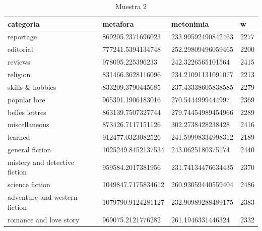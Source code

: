 \documentclass[12pt,letterpaper,twoside]{article}
\begin{document}
\begin{center}
    \begin{longtable}{| p{} | p{} | p{}|p{}|}
\caption{Muestra 2} 
    \hline
         categoria & metafora & metonimia & w \\ \hline
        reportage & 869205.2371696023 & 233.99592490842463 & 2277 \\ \hline
        editorial & 777241.5394134748 & 252.29809496059465 & 2200 \\ \hline
        reviews & 978095.225396233 & 242.3226565101564 & 2415 \\ \hline
        religion & 831466.3628116096 & 234.21091131091077 & 2213 \\ \hline
        skills \& hobbies & 833209.3790445685 & 237.43338605838585 & 2279 \\ \hline
        popular lore & 965391.1906183016 & 270.5444999444997 & 2369 \\ \hline
        belles lettres & 863139.7507327744 & 279.74454989454966 & 2289 \\ \hline
        miscellaneous & 873426.7117151126 & 302.2738428238428 & 2416 \\ \hline
        learned & 912477.0323082526 & 241.59998334998312 & 2189 \\ \hline
        general fiction & 1025249.8452137534 & 243.0625180375174 & 2440 \\ \hline
        mistery and detective fiction & 959584.2017381956 & 231.74134476634435 & 2370 \\ \hline
        science fiction & 1049847.7175834612 & 260.93059440559404 & 2486 \\ \hline
        adventure and western fiction & 1079790.9124281127 & 232.90989288489175 & 2383 \\ \hline
        romance and love story & 969075.2121776282 & 261.1946331446324 & 2332 \\ \hline
    \end{longtable}
    \label{muestra2}
\end{center}
\end{document}
